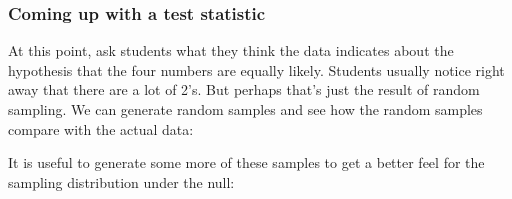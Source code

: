 \subsubsection{Coming up with a test statistic}
At this point, ask students what they think the data indicates about the hypothesis
that the four numbers are equally likely.  Students usually notice right away that 
there are a lot of 2's.  
But perhaps that's just the result of random sampling.  
We can generate random samples and see how the random samples compare with the actual data:
\begin{knitrout}
\end{knitrout}


%
It is useful to generate some more of these samples to get a better feel for the 
sampling distribution under the null:
\begin{knitrout}
\end{knitrout}

